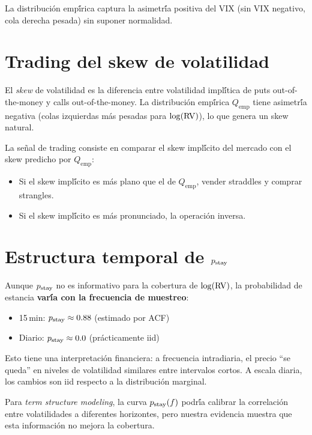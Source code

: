 La distribuci\'{o}n emp\'{\'i}rica captura la asimetr\'{\'i}a positiva del VIX
(sin VIX negativo, cola derecha pesada) sin suponer normalidad.

\section{Trading del skew de volatilidad}

El \emph{skew} de volatilidad es la diferencia entre volatilidad impl\'{\'i}tica
de puts out-of-the-money y calls out-of-the-money. La distribuci\'{o}n
emp\'{\'i}rica $Q_{\text{emp}}$ tiene asimetr\'{\'i}a negativa (colas izquierdas
m\'{a}s pesadas para $\log(\operatorname{RV})$), lo que genera un skew natural.

La se\~{n}al de trading consiste en comparar el skew impl\'{\'i}cito del mercado
con el skew predicho por $Q_{\text{emp}}$:
\begin{itemize}
    \item Si el skew impl\'{\'i}cito es m\'{a}s plano que el de $Q_{\text{emp}}$,
          vender straddles y comprar strangles.
    \item Si el skew impl\'{\'i}cito es m\'{a}s pronunciado, la operaci\'{o}n inversa.
\end{itemize}

\section{Estructura temporal de $p_{\text{stay}}$}

Aunque $p_{\text{stay}}$ no es informativo para la cobertura de $\log(\operatorname{RV})$, la
probabilidad de estancia \textbf{var\'{\'i}a con la frecuencia de muestreo}:
\begin{itemize}
    \item 15\,min: $p_{\text{stay}} \approx 0.88$ (estimado por ACF)
    \item Diario: $p_{\text{stay}} \approx 0.0$ (pr\'{a}cticamente iid)
\end{itemize}

Esto tiene una interpretaci\'{o}n financiera: a frecuencia intradiaria, el
precio ``se queda'' en niveles de volatilidad similares entre intervalos cortos.
A escala diaria, los cambios son iid respecto a la distribuci\'{o}n marginal.

Para \emph{term structure modeling}, la curva $p_{\text{stay}}(f)$ podr\'{\'i}a calibrar
la correlaci\'{o}n entre volatilidades a diferentes horizontes, pero nuestra
evidencia muestra que esta informaci\'{o}n no mejora la cobertura.

